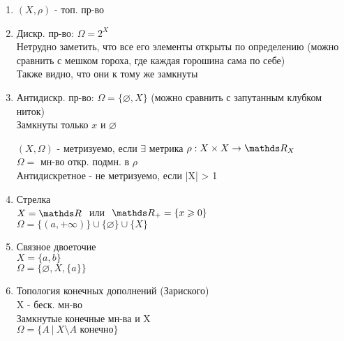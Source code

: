 \documentclass[geometry.tex]{subfiles}
\begin{document}
  \begin{examples}
      \begin{enumerate}
          \item $(X, \rho)$ - топ. пр-во
          \item Дискр. пр-во: $\Omega = 2^X$\\
          Нетрудно заметить, что все его элементы открыты по определению (можно сравнить с мешком гороха, где каждая горошина сама по себе)\\
          Также видно, что они к тому же замкнуты
          \item Антидискр. пр-во: $\Omega = \{\varnothing, X\}$ (можно сравнить с запутанным клубком ниток)\\
          Замкнуты только $x$ и $\varnothing$

      \begin{definition}
          $(X, \Omega)$ - метризуемо, если $\exists$ метрика $\rho: X \times X \rightarrow \R_X$\\
          $\Omega = $ мн-во откр. подмн. в $\rho$\\
          Антидискретное - не метризуемо, если |X| > 1
      \end{definition}
          \item Стрелка\\
                $X = \R  \ $ или $\   \R_+ = \{x \geq 0\}$\\
                $\Omega = \{(a, +\infty)\} \cup \{\varnothing\} \cup \{X\}$
          \item Связное двоеточие\\
                $X = \{a, b\}$\\
                $\Omega = \{\varnothing, X, \{a\}\}$
          \item Топология конечных дополнений (Зариского)\\
                X - беск. мн-во\\
                Замкнутые конечные мн-ва и X \\
                $\Omega = \{A \  | \  X \setminus A \text{ конечно}\}$
      \end{enumerate}
  \end{examples}
\end{document}
